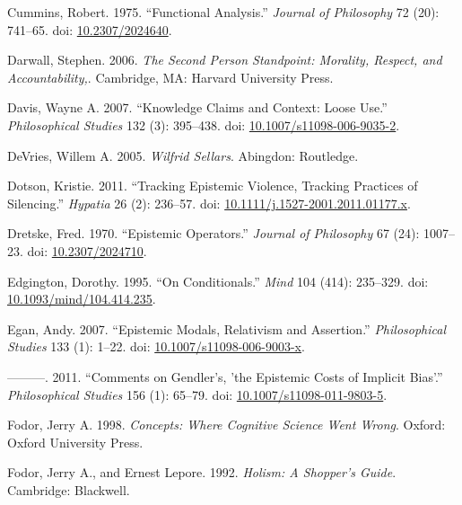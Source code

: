 \documentclass[
  11pt,
  letterpaper,
  DIV=11,
  numbers=noendperiod,
  twoside]{scrartcl}
\newlength{\cslhangindent}
\newenvironment{CSLReferences}[2] %
 {\begin{list}{}{%
  \setlength{\itemindent}{0pt}
  \setlength{\leftmargin}{0pt}
  \setlength{\parsep}{0pt}
  \ifodd #1
   \setlength{\leftmargin}{\cslhangindent}
   \setlength{\itemindent}{-1\cslhangindent}
  \fi
  \setlength{\itemsep}{#2\baselineskip}}}
 {\end{list}}
\begin{document}
\begin{CSLReferences}{1}{0}
Cummins, Robert. 1975. {``Functional Analysis.''} \emph{Journal of
Philosophy} 72 (20): 741--65. doi:
\href{https://doi.org/10.2307/2024640}{10.2307/2024640}.

Darwall, Stephen. 2006. \emph{The Second Person Standpoint: Morality,
Respect, and Accountability,}. Cambridge, MA: Harvard University Press.

Davis, Wayne A. 2007. {``Knowledge Claims and Context: Loose Use.''}
\emph{Philosophical Studies} 132 (3): 395--438. doi:
\href{https://doi.org/10.1007/s11098-006-9035-2}{10.1007/s11098-006-9035-2}.

DeVries, Willem A. 2005. \emph{Wilfrid Sellars}. Abingdon: Routledge.

Dotson, Kristie. 2011. {``Tracking Epistemic Violence, Tracking
Practices of Silencing.''} \emph{Hypatia} 26 (2): 236--57. doi:
\href{https://doi.org/10.1111/j.1527-2001.2011.01177.x}{10.1111/j.1527-2001.2011.01177.x}.

Dretske, Fred. 1970. {``Epistemic Operators.''} \emph{Journal of
Philosophy} 67 (24): 1007--23. doi:
\href{https://doi.org/10.2307/2024710}{10.2307/2024710}.

Edgington, Dorothy. 1995. {``On Conditionals.''} \emph{Mind} 104 (414):
235--329. doi:
\href{https://doi.org/10.1093/mind/104.414.235}{10.1093/mind/104.414.235}.

Egan, Andy. 2007. {``Epistemic Modals, Relativism and Assertion.''}
\emph{Philosophical Studies} 133 (1): 1--22. doi:
\href{https://doi.org/10.1007/s11098-006-9003-x}{10.1007/s11098-006-9003-x}.

---------. 2011. {``Comments on Gendler's, 'the Epistemic Costs of
Implicit Bias'.''} \emph{Philosophical Studies} 156 (1): 65--79. doi:
\href{https://doi.org/10.1007/s11098-011-9803-5}{10.1007/s11098-011-9803-5}.

Fodor, Jerry A. 1998. \emph{Concepts: Where Cognitive Science Went
Wrong}. Oxford: Oxford University Press.

Fodor, Jerry A., and Ernest Lepore. 1992. \emph{Holism: A Shopper's
Guide}. Cambridge: Blackwell.


\end{CSLReferences}
\end{document}
